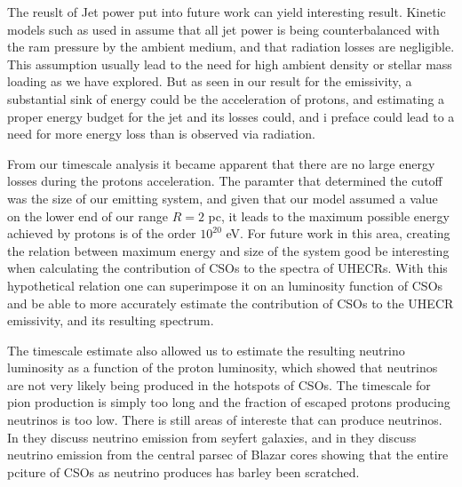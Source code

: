 The reuslt of Jet power put into future work can yield interesting result. Kinetic models such as used in \cite{sullivan2024smallscale} assume that all jet power is being counterbalanced with the ram pressure by the ambient medium, and that radiation losses are negligible. This assumption usually lead to the need for high ambient density or stellar mass loading as we have explored. But as seen in our result for the emissivity, a substantial sink of energy could be the acceleration of protons, and estimating a proper energy budget for the jet and its losses could, and i preface could lead to a need for more energy loss than is observed via radiation.

From our timescale analysis it became apparent that there are no large energy losses during the protons acceleration. The paramter that determined the cutoff was the size of our emitting system, and given that our model assumed a value on the lower end of our range $R = 2$ pc, it leads to the maximum possible energy achieved by protons is of the order $10^20$ eV. For future work in this area, creating the relation between maximum energy and size of the system good be interesting when calculating the contribution of CSOs to the spectra of UHECRs. With this hypothetical relation one can superimpose it on an luminosity function of CSOs and be able to more accurately estimate the contribution of CSOs to the UHECR emissivity, and its resulting spectrum. 

The timescale estimate also allowed us to estimate the resulting neutrino luminosity as a function of the proton luminosity, which showed that neutrinos are not very likely being produced in the hotspots of CSOs. The timescale for pion production is simply too long and the fraction of escaped protons producing neutrinos is too low. There is still areas of intereste that can produce neutrinos. In \cite{neronov2023neutrino} they discuss neutrino emission from seyfert galaxies, and in \cite{Kalashev_2023} they discuss neutrino emission from the central parsec of Blazar cores showing that the entire pciture of CSOs as neutrino produces has barley been scratched. 


